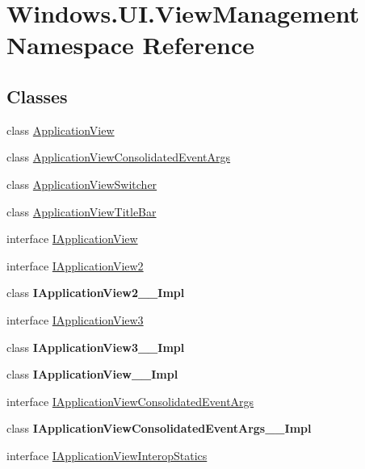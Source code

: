 \hypertarget{namespace_windows_1_1_u_i_1_1_view_management}{}\section{Windows.\+U\+I.\+View\+Management Namespace Reference}
\label{namespace_windows_1_1_u_i_1_1_view_management}
\subsection*{Classes}
\begin{DoxyCompactItemize}
\item 
class \hyperlink{class_windows_1_1_u_i_1_1_view_management_1_1_application_view}{Application\+View}
\item 
class \hyperlink{class_windows_1_1_u_i_1_1_view_management_1_1_application_view_consolidated_event_args}{Application\+View\+Consolidated\+Event\+Args}
\item 
class \hyperlink{class_windows_1_1_u_i_1_1_view_management_1_1_application_view_switcher}{Application\+View\+Switcher}
\item 
class \hyperlink{class_windows_1_1_u_i_1_1_view_management_1_1_application_view_title_bar}{Application\+View\+Title\+Bar}
\item 
interface \hyperlink{interface_windows_1_1_u_i_1_1_view_management_1_1_i_application_view}{I\+Application\+View}
\item 
interface \hyperlink{interface_windows_1_1_u_i_1_1_view_management_1_1_i_application_view2}{I\+Application\+View2}
\item 
class {\bfseries I\+Application\+View2\+\_\+\+\_\+\+Impl}
\item 
interface \hyperlink{interface_windows_1_1_u_i_1_1_view_management_1_1_i_application_view3}{I\+Application\+View3}
\item 
class {\bfseries I\+Application\+View3\+\_\+\+\_\+\+Impl}
\item 
class {\bfseries I\+Application\+View\+\_\+\+\_\+\+Impl}
\item 
interface \hyperlink{interface_windows_1_1_u_i_1_1_view_management_1_1_i_application_view_consolidated_event_args}{I\+Application\+View\+Consolidated\+Event\+Args}
\item 
class {\bfseries I\+Application\+View\+Consolidated\+Event\+Args\+\_\+\+\_\+\+Impl}
\item 
interface \hyperlink{interface_windows_1_1_u_i_1_1_view_management_1_1_i_application_view_interop_statics}{I\+Application\+View\+Interop\+Statics}

\end{DoxyCompactItemize}
